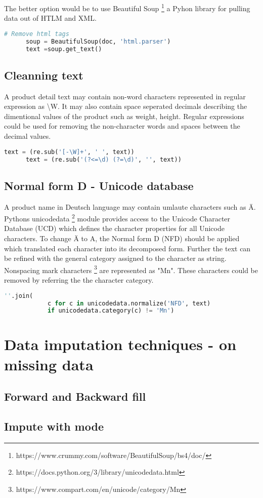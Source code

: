 The better option would be to use Beautiful Soup \footnote{https://www.crummy.com/software/BeautifulSoup/bs4/doc/} a Pyhon library for pulling data out of HTLM and XML.
\begin{lstlisting}[language=Python]
      # Remove html tags 
      soup = BeautifulSoup(doc, 'html.parser')
      text =soup.get_text()
\end{lstlisting}

\subsection{Cleanning text}

A product detail text may contain non-word characters represented in regular expression as \textbackslash W. It may also contain space seperated decimals describing the dimentional values of the product such as weight, height. Regular expressions could be used for removing the non-character words and spaces between the decimal values. 

\begin{lstlisting}[language=Python]
      text = (re.sub('[-\W]+', ' ', text))
      text = (re.sub('(?<=\d) (?=\d)', '', text))
\end{lstlisting}

\subsection{Normal form D - Unicode database}

A product name in Deutsch language may contain umlaute characters such as \"A.  Pythons unicodedata \footnote{https://docs.python.org/3/library/unicodedata.html} module provides access to the Unicode Character Database (UCD) which defines the character properties for all Unicode characters. To change \"A to A, the Normal form D (NFD) should be applied which translated each character into its decomposed form. Further the text can be refined with the general category assigned to the character as string. Nonspacing mark characters \footnote{https://www.compart.com/en/unicode/category/Mn} are represented as "Mn". These characters could be removed by referring the the character category.
\begin{lstlisting}[language=Python]
      ''.join(
            c for c in unicodedata.normalize('NFD', text)
            if unicodedata.category(c) != 'Mn')
\end{lstlisting}



\section {Data imputation techniques - on missing data} \label{dataimput}

\subsection {Forward and Backward fill}

\subsection {Impute with mode}
